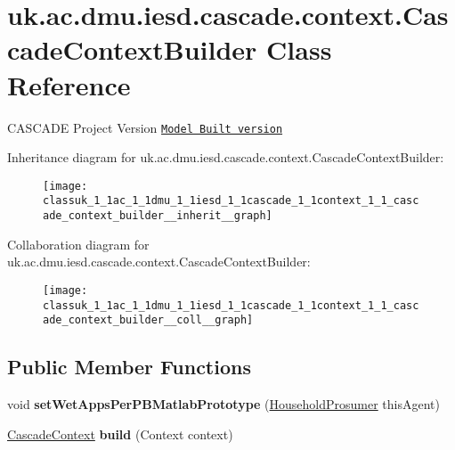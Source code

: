 \hypertarget{classuk_1_1ac_1_1dmu_1_1iesd_1_1cascade_1_1context_1_1_cascade_context_builder}{\section{uk.\-ac.\-dmu.\-iesd.\-cascade.\-context.\-Cascade\-Context\-Builder Class Reference}
\label{classuk_1_1ac_1_1dmu_1_1iesd_1_1cascade_1_1context_1_1_cascade_context_builder}
}


C\-A\-S\-C\-A\-D\-E Project Version \href{Version# for the entire project/ as whole}{\tt Model Built version}  




Inheritance diagram for uk.\-ac.\-dmu.\-iesd.\-cascade.\-context.\-Cascade\-Context\-Builder\-:\nopagebreak
\begin{figure}[H]
\begin{center}
\leavevmode
\texttt{[image: classuk\_1\_1ac\_1\_1dmu\_1\_1iesd\_1\_1cascade\_1\_1context\_1\_1\_cascade\_context\_builder\_\_inherit\_\_graph]}
\end{center}
\end{figure}


Collaboration diagram for uk.\-ac.\-dmu.\-iesd.\-cascade.\-context.\-Cascade\-Context\-Builder\-:\nopagebreak
\begin{figure}[H]
\begin{center}
\leavevmode
\texttt{[image: classuk\_1\_1ac\_1\_1dmu\_1\_1iesd\_1\_1cascade\_1\_1context\_1\_1\_cascade\_context\_builder\_\_coll\_\_graph]}
\end{center}
\end{figure}
\subsection*{Public Member Functions}
\begin{DoxyCompactItemize}
\item 
\hypertarget{classuk_1_1ac_1_1dmu_1_1iesd_1_1cascade_1_1context_1_1_cascade_context_builder_a77732fa12fe98e6ab345a712cef1045c}{void {\bfseries set\-Wet\-Apps\-Per\-P\-B\-Matlab\-Prototype} (\hyperlink{classuk_1_1ac_1_1dmu_1_1iesd_1_1cascade_1_1agents_1_1prosumers_1_1_household_prosumer}{Household\-Prosumer} this\-Agent)}\label{classuk_1_1ac_1_1dmu_1_1iesd_1_1cascade_1_1context_1_1_cascade_context_builder_a77732fa12fe98e6ab345a712cef1045c}

\item 
\hypertarget{classuk_1_1ac_1_1dmu_1_1iesd_1_1cascade_1_1context_1_1_cascade_context_builder_a0bfbe1be5df63ed8af9e15554fbb86af}{\hyperlink{classuk_1_1ac_1_1dmu_1_1iesd_1_1cascade_1_1context_1_1_cascade_context}{Cascade\-Context} {\bfseries build} (Context context)}\label{classuk_1_1ac_1_1dmu_1_1iesd_1_1cascade_1_1context_1_1_cascade_context_builder_a0bfbe1be5df63ed8af9e15554fbb86af}

\end{DoxyCompactItemize}


